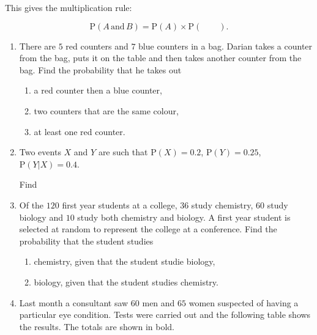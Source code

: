 This gives the multiplication rule:

\[
\text{P}(A \,\text{and}\, B) =  \text{P}(A) \times  \text{P}(\qquad ).
\]

\exercise  %

\begin{enumerate}
	\item There are $5$ red counters and $7$ blue counters in a bag. Darian takes  a counter from the bag, puts it on the table and then takes another counter from the bag. Find the probability  that he takes out
	
	\begin{enumerate}
		\item a red counter then a blue counter,
		\item two counters that are the same colour,
		\item at least one red counter.
	\end{enumerate} 


  \item  Two events $X$ and $Y$ are such that $\text{P}(X)=0.2$,  $\text{P}(Y)=0.25$,  $\text{P}(Y|X)=0.4$.
  
  Find 



\item Of the $120$ first year students at a college, $36$ study chemistry, $60$ study biology and $10$ study both chemistry and biology. A first year student is selected at random to represent the college at a conference. Find the probability that the student studies
\begin{enumerate}
	\item chemistry, given that the student studie biology,
	\item biology, given that the student studies  chemistry.
\end{enumerate}

\item Last month a consultant saw $60$ men and $65$ women suspected  of having a particular eye condition. Tests were carried out and the following table shows the results. The totals are shown in bold.


\end{enumerate}
